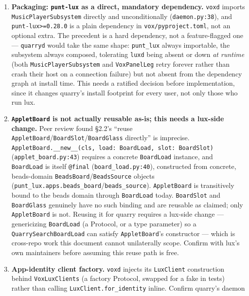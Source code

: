 \documentclass[a4paper,11pt]{report}
\begin{document}
\begin{enumerate}
  \item \textbf{Packaging: \texttt{punt-lux} as a direct, mandatory
    dependency.} \texttt{voxd} imports \texttt{MusicPlayerSubsystem}
    directly and unconditionally (\texttt{daemon.py:38}), and
    \texttt{punt-lux>=0.28.0} is a plain dependency in
    \texttt{vox/pyproject.toml}, not an optional extra. The precedent is
    a hard dependency, not a feature-flagged one --- \texttt{quarryd}
    would take the same shape: \texttt{punt\_lux} always importable,
    the subsystem always composed, tolerating \texttt{luxd} being absent
    or down \emph{at runtime} (both \texttt{MusicPlayerSubsystem} and
    \texttt{VoxPanelLeg} retry forever rather than crash their host on a
    connection failure) but not absent from the dependency graph at
    install time. This needs a ratified decision before implementation,
    since it changes quarry's install footprint for every user, not only
    those who run lux.
  \item \textbf{\texttt{AppletBoard} is not actually reusable as-is; this
    needs a lux-side change.} Peer review found \S2.2's ``reuse
    \texttt{AppletBoard}/\texttt{BoardSlot}/\texttt{BoardGlass} directly''
    is imprecise. \texttt{AppletBoard.\_\_new\_\_(cls, load: BoardLoad,
    slot: BoardSlot)} (\texttt{applet\_board.py:43}) requires a concrete
    \texttt{BoardLoad} instance, and \texttt{BoardLoad} is itself
    \texttt{@final} (\texttt{board\_load.py:40}), constructed from
    concrete, beads-domain \texttt{BeadsBoard}/\texttt{BeadsSource}
    objects (\texttt{punt\_lux.apps.beads\_board}/\texttt{beads\_source}).
    \texttt{AppletBoard} is transitively bound to the beads domain through
    \texttt{BoardLoad} today. \texttt{BoardSlot} and \texttt{BoardGlass}
    genuinely have no such binding and are reusable as claimed; only
    \texttt{AppletBoard} is not. Reusing it for quarry requires a
    lux-side change --- genericizing \texttt{BoardLoad} (a Protocol, or a
    type parameter) so a \texttt{QuarrySearchBoardLoad} can satisfy
    \texttt{AppletBoard}'s constructor --- which is cross-repo work this
    document cannot unilaterally scope. Confirm with lux's own
    maintainers before assuming this reuse path is free.
  \item \textbf{App-identity client factory.} \texttt{voxd} injects its
    \texttt{LuxClient} construction behind \texttt{VoxLuxClients}
    (a factory Protocol, swapped for a fake in tests) rather than calling
    \texttt{LuxClient.for\_identity} inline. Confirm quarry's daemon

\end{enumerate}
\end{document}

